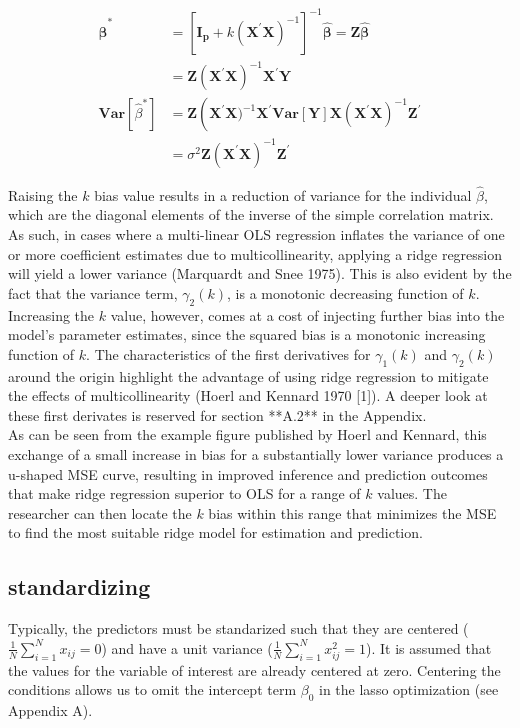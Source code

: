 $$
\begin{aligned}
\hat{\boldsymbol{\beta}}^{*} &=\left[\mathbf{I}_{\mathbf{p}}+k\left(\mathbf{X}^{\prime} \mathbf{X}\right)^{-1}\right]^{-1}\hat{\boldsymbol{\beta}}=\mathbf{Z}\hat{\boldsymbol{\beta}}\\&=\mathbf{Z}\left(\mathbf{X}^{\prime} \mathbf{X}\right)^{-1} \mathbf{X}^{\prime} \mathbf{Y}\\\mathbf{Var}\left[\hat{\beta}^{*}\right] &=\mathbf{Z}\left(\mathbf{X}^{\prime} \mathbf{X})^{-1} \mathbf{X}^{\prime} \mathbf{Var}[\mathbf{Y}] \mathbf{X}\left(\mathbf{X}^{\prime} \mathbf{X}\right)^{-1} \mathbf{Z}^{\prime}\right.\\
&=\sigma^{2} \mathbf{Z}\left(\mathbf{X}^{\prime} \mathbf{X}\right)^{-1} \mathbf{Z}^{\prime} 
\end{aligned}
$$	 

\noindent Raising the $k$ bias value results in a reduction of variance for the individual $\hat{\beta}$, which are the diagonal elements of the inverse of the simple correlation matrix. As such, in cases where a multi-linear OLS regression inflates the variance of one or more coefficient estimates due to multicollinearity, applying a ridge regression will yield a lower variance (Marquardt and Snee 1975). This is also evident by the fact that the variance term, $\gamma_{2}(k)$, is a monotonic decreasing function of $k$. Increasing the $k$ value, however, comes at a cost of injecting further bias into the model’s parameter estimates, since the squared bias is a monotonic increasing function of $k$. The characteristics of the first derivatives for $\gamma_{1}(k)$ and $\gamma_{2}(k)$ around the origin highlight the advantage of using ridge regression to mitigate the effects of multicollinearity (Hoerl and Kennard 1970 [1]). A deeper look at these first derivates is reserved for section **A.2** in the Appendix. \\

\noindent As can be seen from the example figure published by Hoerl and Kennard, this exchange of a small increase in bias for a substantially lower variance produces a u-shaped MSE curve, resulting in improved inference and prediction outcomes that make ridge regression superior to OLS for a range of $k$ values. The researcher can then locate the $k$ bias within this range that minimizes the MSE to find the most suitable ridge model for estimation and prediction.


\subsection{standardizing}

\noindent Typically, the predictors must be standarized such that they are centered ($\frac{1}{N} \sum_{i=1}^{N} x_{ij}=0$) and have a unit variance ($\frac{1}{N} \sum_{i=1}^{N} x_{ij}^2=1$). It is assumed that the values for the variable of interest are already centered at zero. Centering the conditions allows us to omit the intercept term $\beta_0$ in the lasso optimization (see Appendix A). \\